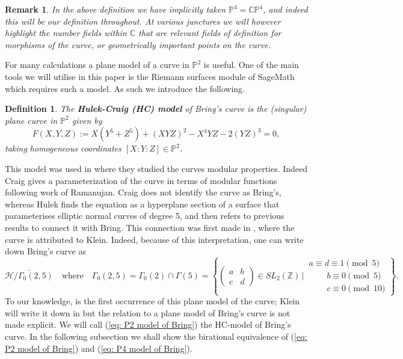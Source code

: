 \documentclass{amsart}
\newtheorem{definition}[theorem]{Definition}
\newtheorem{remark}[theorem]{Remark}
\newcommand{\bam}[1]{\textbf{#1}}
\begin{document}
\begin{remark}
In the above definition we have implicitly taken $\mathbb{P}^4 = \mathbb{CP}^4$, and indeed this will be our definition throughout. At various junctures we will however highlight the number fields within $\mathbb{C}$ that are relevant fields of definition for morphisms of the curve, or geometrically important points on the curve.
\end{remark}

For many calculations a plane model of a curve in $\mathbb{P}^2$ is useful.
One of the main tools we will utilise in this paper is the Riemann surfaces module of SageMath \cite{sagemath2021} which requires such a model. As such we introduce the following.
\begin{definition}
The \bam{Hulek-Craig (HC) model} of Bring's curve is the (singular) plane curve in $\mathbb{P}^2$ given by 
\begin{equation}\label{eq: P2 model of Bring}
  F(X,Y,Z) :=
    X(Y^5+Z^5) + (XYZ)^2 - X^4YZ -2(YZ)^3  = 0  ,
\end{equation}
taking homogeneous coordinates $[X:Y:Z] \in \mathbb{P}^2$.
\end{definition}
This model was used in \cite{Hulek1985, Craig2002} where they studied the curves modular properties. Indeed Craig gives a parameterization of the curve in terms of modular functions following work of Ramanujan. Craig does not identify the curve as Bring's, whereas Hulek finds the equation as a hyperplane section of a surface that parameterises elliptic normal curves of degree 5, and then refers to previous results to connect it with Bring. This connection was first made in \cite{Naruki1978}, where the curve is attributed to Klein. Indeed, because of this interpretation, one can write down Bring's curve as 
\[
\overline{\mathcal{H}/\Gamma_0(2, 5)} \quad \text{where} \quad \Gamma_0(2,5) = \Gamma_0(2) \cap \Gamma(5) =  \left\lbrace\begin{pmatrix} a & b \\ c & d \end{pmatrix} \in SL_2(\mathbb{Z}) \, \big\vert \, \begin{array}{l} a \equiv d \equiv 1\pmod 5 \\ \phantom{d \equiv } \;  b \equiv 0  \pmod 5 \\ \phantom{d \equiv } \; c \equiv 0  \pmod{10} \end{array} \right \rbrace . 
\]
To our knowledge, \cite{Hulek1985} is the first occurrence of this plane model of the curve; Klein will write it down in \cite[p. 165, p. 242]{Klein1888} but the relation to a plane model of Bring's curve is not made explicit. We will call (\ref{eq: P2 model of Bring}) the HC-model of Bring's curve. In the following subsection we shall show the birational equivalence of (\ref{eq: P2 model of Bring}) and (\ref{eq: P4 model of Bring}).
\end{document}
